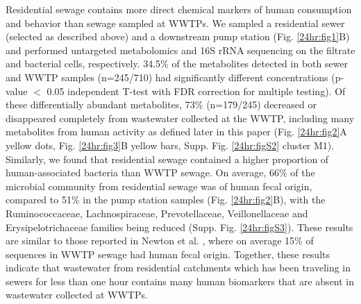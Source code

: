 Residential sewage contains more direct chemical markers of human consumption and behavior than sewage sampled at WWTPs. We sampled a residential sewer (selected as described above) and a downstream pump station (Fig. \ref{24hr:fig1}B) and performed untargeted metabolomics and 16S rRNA sequencing on the filtrate and bacterial cells, respectively. 34.5\% of the metabolites detected in both sewer and WWTP samples (n=245/710) had significantly different concentrations (p-value $<$ 0.05 independent T-test with FDR correction for multiple testing). Of these differentially abundant metabolites, 73\% (n=179/245) decreased or disappeared completely from wastewater collected at the WWTP, including many metabolites from human activity as defined later in this paper (Fig. \ref{24hr:fig2}A yellow dots, Fig. \ref{24hr:fig3}B yellow bars, Supp. Fig. \ref{24hr:figS2} cluster M1). Similarly, we found that residential sewage contained a higher proportion of human-associated bacteria than WWTP sewage. On average, 66\% of the microbial community from residential sewage was of human fecal origin, compared to 51\% in the pump station samples (Fig. \ref{24hr:fig2}B), with the Ruminococcaceae, Lachnospiraceae, Prevotellaceae, Veillonellaceae and Erysipelotrichaceae families being reduced (Supp. Fig. \ref{24hr:figS3}). These results are similar to those reported in Newton et al. \cite{Newton2015}, where on average 15\% of sequences in WWTP sewage had human fecal origin. Together, these results indicate that wastewater from residential catchments which has been traveling in sewers for less than one hour contains many human biomarkers that are absent in wastewater collected at WWTPs.

